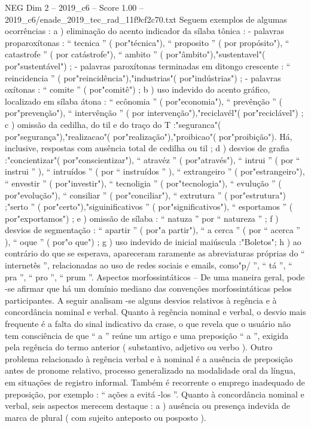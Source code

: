\begin{textsample}{NEG Dim 2 – 2019\_c6 – Score 1.00 – 2019\_c6/enade\_2019\_tec\_rad\_11f9cf2c70.txt}
Seguem exemplos de algumas ocorrências : a ) eliminação do acento indicador da sílaba tônica : - palavras proparoxítonas : “ tecnica ” ( por"técnica"), “ proposito ” ( por propósito"), “ catastrofe ” ( por catástrofe"), “ ambito ” ( por"âmbito"),"sustentavel"( por"sustentável") ; - palavras paroxítonas terminadas em ditongo crescente : “ reincidencia ” ( por"reincidência"),"industrias"( por"indústrias") ; - palavras oxítonas : “ comite ” ( por"comitê") ; b ) uso indevido do acento gráfico, localizado em sílaba átona : “ ecônomia ” ( por"economia"), “ prevênção ” ( por"prevenção"), “ intervênção ” ( por intervenção"),"reciclavél"( por"reciclável") ; c ) omissão da cedilha, do til e do traço do T :"seguranca"( por"segurança"),"realizacao"( por"realização"),"proibicao"( por"proibição").
Há, inclusive, respostas com ausência total de cedilha ou til ; d ) desvios de grafia :"concientizar"( por"conscientizar"), “ atravéz ” ( por"através"), “ intrui ” ( por “ instrui ” ), “ intruídos ” ( por “ instruídos ” ), “ extrangeiro ” ( por"estrangeiro"), “ envestir ” ( por"investir"), “ tecnoligia ” ( por"tecnologia"), “ evulução ” ( por"evolução"), “ consiliar ” ( por"conciliar"), “ extrutura ” ( por"estrutura") ;"serto ” ( por"certo"),"siguinificativos ” ( por"significativos"), “ esportamos ” ( por"exportamos") ; e ) omissão de sílaba : “ natuza ” por “ natureza ” ; f ) desvios de segmentação : “ apartir ” ( por"a partir"), “ a cerca ” ( por “ acerca ” ), “ oque ” ( por"o que") ; g ) uso indevido de inicial maiúscula :"Boletos"; h ) ao contrário do que se esperava, apareceram raramente as abreviaturas próprias do “ internetês ”, relacionadas ao uso de redes sociais e emails, como"p/ ”, “ tá ”, “ pra ”, “ pro ”, “ prum ”.
Aspectos morfossintáticos – De uma maneira geral, pode -se afirmar que há um domínio mediano das convenções morfossintáticas pelos participantes.
A seguir analisam -se alguns desvios relativos à regência e à concordância nominal e verbal.
Quanto à regência nominal e verbal, o desvio mais frequente é a falta do sinal indicativo da crase, o que revela que o usuário não tem consciência de que “ a ” reúne um artigo e uma preposição “ a ”, exigida pela regência do termo anterior ( substantivo, adjetivo ou verbo ).
Outro problema relacionado à regência verbal e à nominal é a ausência de preposição antes de pronome relativo, processo generalizado na modalidade oral da língua, em situações de registro informal.
Também é recorrente o emprego inadequado de preposição, por exemplo : “ ações a evitá -los ”.
Quanto à concordância nominal e verbal, seis aspectos merecem destaque : a ) ausência ou presença indevida de marca de plural ( com sujeito anteposto ou posposto ).

\end{textsample}
